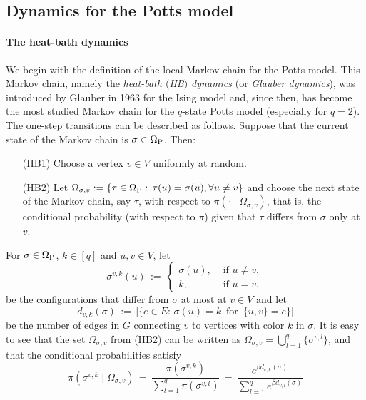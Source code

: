 \documentclass{dis}
\theoremstyle{citing}
\begin{document}
\subsection
{Dynamics for the Potts model}

\paragraph{\bf The heat-bath dynamics}  
We begin with the definition of the local Markov chain for the 
Potts model. 
This Markov chain, namely the 
\emph{heat-bath $($HB$)$ dynamics}
(or \emph{Glauber dynamics}), 
was introduced by Glauber \cite{Glauber} in 1963 for the 
Ising model and, since then, has become the most studied Markov 
chain for the $q$-state Potts model (especially for $q=2$). 
The one-step transitions can be described as follows. 
Suppose that the current state of the Markov chain is 
$\sigma\in{\Omega}_{\rm P}$. Then:
\begin{itemize}\label{page:P-HB}
	\item[(HB1)] Choose a vertex $v\in V$ uniformly at random.
	\item[(HB2)] Let 	${\Omega}_{\sigma,v}:=\{\tau\in{\Omega}_{\rm P}:\, 
											\tau(u)=\sigma(u), \forall u\neq v\}$
						and choose the next state of the Markov chain, 
						say $\tau$, with respect to 
						$\pi(\cdot\mid{\Omega}_{\sigma,v})$, that is, the conditional 
						probability (with respect to $\pi$) given that $\tau$ differs 
						from $\sigma$ only at $v$.
\end{itemize}
For $\sigma\in{\Omega}_{\rm P}$, $k\in[q]$ and $u,v\in V$, 
let
\begin{equation} \label{eq:sigma_v_k}
\sigma^{v,k}(u) \,:=\, \begin{cases}
\sigma(u), & \text{ if } u\neq v, \\
k, & \text{ if } u=v,
\end{cases} 
\end{equation}
be the configurations that differ from $\sigma$ at most at $v\in V$ 
and let 
\[
d_{v,k}(\sigma) 
\,:=\, {\left\vert {\bigl\{e\in E:\, \sigma(u)=k \,\text{ for }\, \{u,v\}=e\bigr\}} \right\vert}
\]
be the number of edges in $G$ connecting $v$ to vertices with 
color $k$ in $\sigma$.
It is easy to see that the set ${\Omega}_{\sigma,v}$ from (HB2) 
can be written as ${\Omega}_{\sigma,v}=\bigcup_{l=1}^q\{\sigma^{v,l}\}$, 
and that the conditional probabilities 
satisfy
\begin{equation} \label{eq:HB-cond}
\pi(\sigma^{v,k}\mid{\Omega}_{\sigma,v}) \,=\, \frac{\pi(\sigma^{v,k})}
	{\sum_{l=1}^q\pi(\sigma^{v,l})}
\,=\, \frac{e^{\beta d_{v,k}(\sigma)}}{\sum_{l=1}^q e^{\beta d_{v,l}(\sigma)}}
\end{equation}
\end{document}
